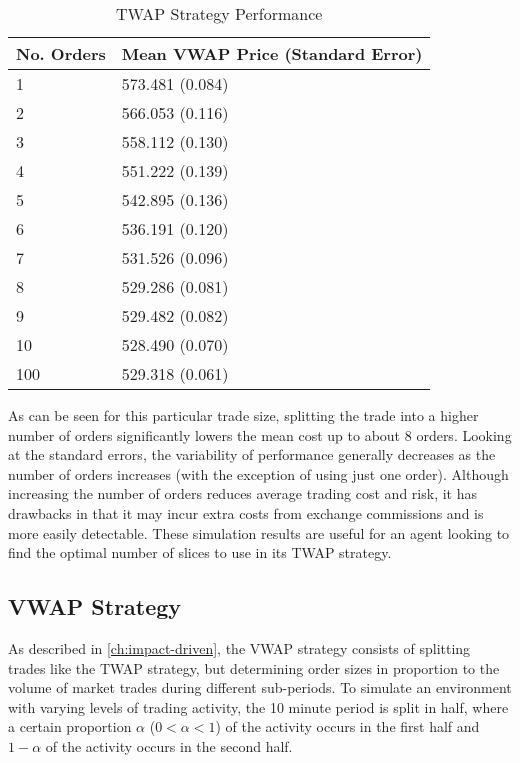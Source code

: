 \begin{table}[htbp]
\begin{center}
\caption{TWAP Strategy Performance} \label{tab:twap_strategy}
\begin{tabular}{l|l}
\hline \hline
\textbf{No. Orders} & \textbf{Mean VWAP Price (Standard Error)} \\
\hline
1                & 573.481 (0.084)            \\
2                & 566.053 (0.116)            \\
3                & 558.112 (0.130)            \\
4                & 551.222 (0.139)            \\
5                & 542.895 (0.136)            \\
6                & 536.191 (0.120)            \\
7                & 531.526 (0.096)            \\
8                & 529.286 (0.081)            \\
9                & 529.482 (0.082)            \\
10               & 528.490 (0.070)            \\
100              & 529.318 (0.061)           
\end{tabular}
\end{center}
\end{table}

As can be seen for this particular trade size, splitting the trade into a higher number of orders significantly lowers the mean cost up to about 8 orders. Looking at the standard errors, the variability of performance generally decreases as the number of orders increases (with the exception of using just one order). Although increasing the number of orders reduces average trading cost and risk, it has drawbacks in that it may incur extra costs from exchange commissions and is more easily detectable. These simulation results are useful for an agent looking to find the optimal number of slices to use in its TWAP strategy. 

\subsection{VWAP Strategy}
As described in \ref{ch:impact-driven}, the VWAP strategy consists of splitting trades like the TWAP strategy, but determining order sizes in proportion to the volume of market trades during different sub-periods. To simulate an environment with varying levels of trading activity, the 10 minute period is split in half, where a certain proportion $\alpha$ ($0 < \alpha < 1$) of the activity occurs in the first half and $1-\alpha$ of the activity occurs in the second half. 

